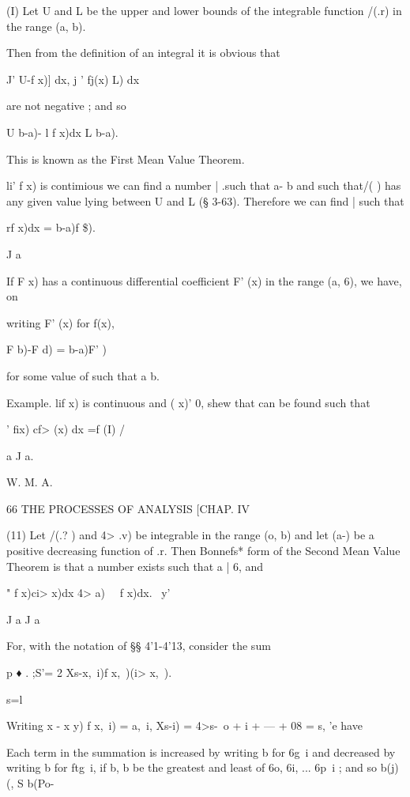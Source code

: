 (I) Let U and L be the upper and lower bounds of the integrable function /(.r) in the 
range (a, b). 

Then from the definition of an integral it is obvious that 

J'    U-f x)] dx, j ' fj(x)   L) dx 

are not negative ; and so 

U b-a)- l f x)dx L b-a). 

This is known as the First Mean Value Theorem. 

li' f x) is contimious we can find a number | .such that a-  b and such that/( ) has 
any given value lying between U and L (§ 3-63). Therefore we can find | such that 



rf x)dx =  b-a)f \$). 

J a 



If F x) has a continuous differential coefficient F' (x) in the range (a, 6), we have, on 

writing F' (x) for f(x), 

F b)-F d) =  b-a)F'  ) 

for some value of   such that a  b. 

Example. lif x) is continuous and (   x)' 0, shew that   can be found such that 



' fix) cf> (x) dx =f (I) / %

a J a. 



W. M. A. 



66 THE PROCESSES OF ANALYSIS [CHAP. IV 

(11) Let /(.? ) and 4> .v) be integrable in the range (o, b) and let  (a-) be a positive 
decreasing function of .r. Then Bonnefs* form of the Second Mean Value Theorem is 
that a number   exists such that a   |   6, and 

 " f x)ci> x)dx 4> a) \ \   f x)dx. \ y' 

J a J a 

For, with the notation of §§ 4'1-4'13, consider the sum 

p 
♦ . ;S'= 2  Xs-x,\ i)f x,\  )(i> x,\  ). 

s=l 

Writing  x - x y) f x,\ i) = a,\ i,   Xs-i) = 4>s-\,  o +  i + --- + 08 =  s,  'e have 

Each term in the summation is increased by writing b for 6g\ i and decreased by 
writing b for ftg\ i, if b, b be the greatest and least of 6o, 6i, ... 6p\ i ; and so b(j)(, S  b(Po- 

